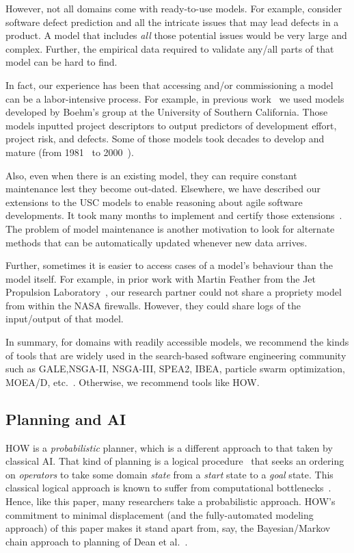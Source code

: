 \documentclass[conference]{IEEEtran}
\begin{document}
However, not all domains come with ready-to-use models. For example, 
consider software defect prediction and all the intricate issues that may lead defects in a product. A model that includes {\em all} those
potential issues would be very large and complex. Further,
the empirical data required to validate any/all parts
of that model can be hard to find.



In fact, our experience has been that accessing and/or commissioning
a model can be a labor-intensive process.
For  example, in previous work~\cite{me07f} we used models
developed by Boehm's group at the University of Southern California.
Those models inputted project descriptors to output predictors
of development effort, project risk, and defects.
Some of those models took decades to develop and mature (from 1981~\cite{boehm81} to 2000~\cite{boehm00b}). 

Also, even when there is an existing model, they can require
constant  maintenance lest they become out-dated. Elsewhere, we have described our
extensions to the USC models to enable reasoning about agile software developments. 
It took many months to implement and certify those extensions~\cite{me09i,me09j}.
The problem of model maintenance is another
motivation to look for alternate methods that can be automatically updated whenever new data arrives.

Further, sometimes  it is easier to access cases of a model's behaviour than the model
itself. For example, in prior work with Martin  Feather from the Jet Propulsion
Laboratory~\cite{fea02a},  our research partner could not share a
propriety model from within the NASA firewalls. However, they could share 
logs of the input/output of that model.

In summary, for domains with readily accessible models, we recommend
the kinds of tools that are widely used in the search-based
software engineering community such as GALE,NSGA-II, NSGA-III, SPEA2, IBEA, particle swarm optimization, MOEA/D, etc.~\cite{krall14,deb00a,zit02,zit04,%
deb14,Cui2005a,zhang07:TEC}. Otherwise, we recommend tools like HOW.


\subsection{Planning and AI}
HOW is a {\em probabilistic} planner, which is a different approach to that taken by
classical AI. 
That kind of planning is a logical procedure~\cite{Fikes1971}
that seeks an ordering on {\em operators} to take some domain
{\em state} from a {\em start} state to a {\em  goal} state.
This classical logical approach is known to suffer from
computational bottlenecks~\cite{Bylander1994}. Hence,
like this paper,
many researchers take a probabilistic approach.
HOW's commitment to minimal displacement (and the fully-automated
modeling approach) of this paper makes it stand apart from, say,
  the Bayesian/Markov chain approach to planning of Dean et al.~\cite{dean1995planning}.
\end{document}
